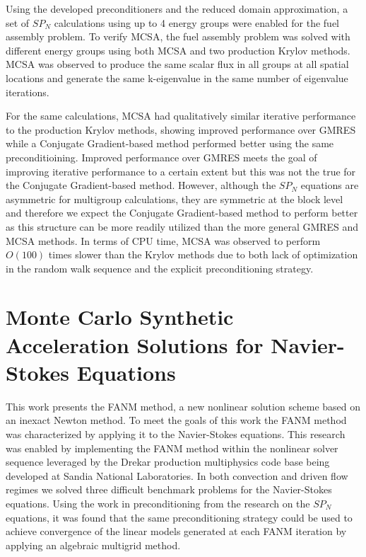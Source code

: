 Using the developed preconditioners and the reduced domain
approximation, a set of $SP_N$ calculations using up to 4 energy
groups were enabled for the fuel assembly problem. To verify MCSA, the
fuel assembly problem was solved with different energy groups using
both MCSA and two production Krylov methods. MCSA was observed to
produce the same scalar flux in all groups at all spatial locations
and generate the same k-eigenvalue in the same number of eigenvalue
iterations. 

For the same calculations, MCSA had qualitatively similar iterative
performance to the production Krylov methods, showing improved
performance over GMRES while a Conjugate Gradient-based method
performed better using the same preconditioining. Improved performance
over GMRES meets the goal of improving iterative performance to a
certain extent but this was not the true for the Conjugate
Gradient-based method. However, although the $SP_N$ equations are
asymmetric for multigroup calculations, they are symmetric at the
block level and therefore we expect the Conjugate Gradient-based
method to perform better as this structure can be more readily
utilized than the more general GMRES and MCSA methods. In terms of CPU
time, MCSA was observed to perform $O(100)$ times slower than the
Krylov methods due to both lack of optimization in the random walk
sequence and the explicit preconditioning strategy.

\section{Monte Carlo Synthetic Acceleration Solutions for Navier-Stokes Equations\ }
\label{sec:nonlinear_conclusions}

This work presents the FANM method, a new nonlinear solution scheme
based on an inexact Newton method. To meet the goals of this work the
FANM method was characterized by applying it to the Navier-Stokes
equations. This research was enabled by implementing the FANM method
within the nonlinear solver sequence leveraged by the Drekar production
multiphysics code base being developed at Sandia National
Laboratories. In both convection and driven flow regimes we solved
three difficult benchmark problems for the Navier-Stokes
equations. Using the work in preconditioning from the research on the
$SP_N$ equations, it was found that the same preconditioning strategy
could be used to achieve convergence of the linear models generated at
each FANM iteration by applying an algebraic multigrid method.

